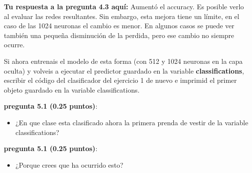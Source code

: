 \documentclass[12pt,a4paper,table]{article}
\providecommand{\tightlist}{%
      \setlength{\itemsep}{0pt}\setlength{\parskip}{0pt}}
\begin{document}
    \textbf{Tu respuesta a la pregunta 4.3 aquí:} Aumentó el accuracy. Es posible
verlo al evaluar las redes resultantes. Sin embargo, esta mejora tiene
un límite, en el caso de las 1024 neuronas el cambio es menor. En
algunos casos se puede ver también una pequeña disminución de la
perdida, pero ese cambio no siempre ocurre.

    Si ahora entrenais el modelo de esta forma (con 512 y 1024 neuronas en
la capa oculta) y volveis a ejecutar el predictor guardado en la
variable \textbf{classifications}, escribir el código del clasificador
del ejercicio 1 de nuevo e imprimid el primer objeto guardado en la
variable classifications.

\textbf{pregunta 5.1 (0.25 puntos)}:

\begin{itemize}
\tightlist
\item
  ¿En que clase esta clasificado ahora la primera prenda de vestir de la
  variable classifications?
\end{itemize}

\textbf{pregunta 5.1 (0.25 puntos)}:

\begin{itemize}
\tightlist
\item
  ¿Porque crees que ha ocurrido esto?
\end{itemize}
\end{document}

